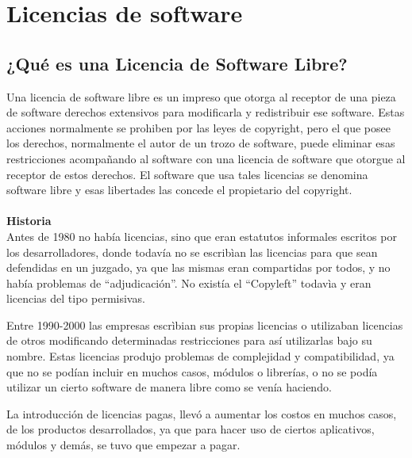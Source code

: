 \chapter{Licencias de software}


\section{¿Qué es una Licencia de Software Libre?}

Una licencia de software libre es un impreso que otorga al receptor de una pieza de software derechos extensivos para modificarla y redistribuir ese software. Estas acciones normalmente se prohiben por las leyes de copyright, pero el que posee los derechos, normalmente el autor de un trozo de software, puede eliminar esas restricciones acompañando al software con una licencia de software que otorgue al receptor de estos derechos. El software que usa tales licencias se denomina software libre y esas libertades las concede el propietario del copyright.
\\
\\
{\bf Historia}
\\
Antes de 1980 no había licencias, sino que eran estatutos informales escritos por los desarrolladores, donde todavía no se escribìan las licencias para que sean defendidas en un juzgado, ya que las mismas eran compartidas por todos, y no había problemas de “adjudicación”.
No existía el “Copyleft” todavìa y eran licencias del tipo permisivas.

Entre 1990-2000 las empresas escrìbian sus propias licencias o utilizaban licencias de otros modificando determinadas restricciones para así utilizarlas bajo su nombre. 
Estas licencias produjo problemas de complejidad y compatibilidad, ya que no se podían incluir en muchos casos, módulos o librerías, o no se podía utilizar un cierto software de manera libre como se venía haciendo.

La introducción de licencias pagas, llevó a aumentar los costos en muchos casos, de los productos desarrollados, ya que para hacer uso de ciertos aplicativos, módulos y demás, se tuvo que empezar a pagar.
\newpage
